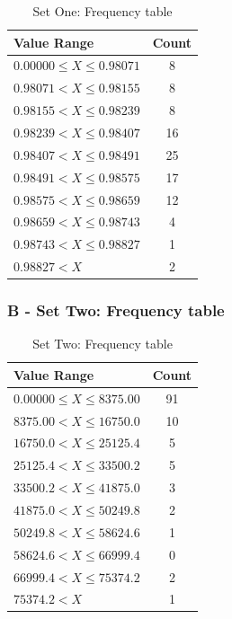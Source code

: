 \documentclass[10pt]{report}
\begin{document}
\begin{table}[h!]
	\centering

	\begin{tabular}{ | l | c | }
		\hline
		Value Range & Count \\
		\hline
		$0.00000 \leq X \leq   0.98071$ & 8  \\
		$0.98071 < X \leq   0.98155$ & 8  \\
		$0.98155 < X \leq   0.98239$ & 8  \\
		$0.98239 < X \leq   0.98407$ & 16 \\
		$0.98407 < X \leq   0.98491$ & 25 \\
		$0.98491 < X \leq   0.98575$ & 17 \\
		$0.98575 < X \leq   0.98659$ & 12 \\
		$0.98659 < X \leq   0.98743$ & 4  \\
		$0.98743 < X \leq   0.98827$ & 1  \\
		$0.98827 < X               $ & 2  \\
		\hline
	\end{tabular}
	\caption{Set One: Frequency table}
\end{table}



\subsubsection*{B - Set Two: Frequency table}

\begin{table}[h!]
	\centering

	\begin{tabular}{ | l | c | }
		\hline
		Value Range & Count \\
		\hline
		$0.00000 \leq X \leq 8375.00$ & 91 \\
		$8375.00  < X \leq 16750.0$ & 10 \\
		$16750.0  < X \leq 25125.4$ & 5  \\
		$25125.4  < X \leq 33500.2$ & 5  \\
		$33500.2  < X \leq 41875.0$ & 3  \\
		$41875.0  < X \leq 50249.8$ & 2  \\
		$50249.8  < X \leq 58624.6$ & 1  \\
		$58624.6  < X \leq 66999.4$ & 0  \\
		$66999.4  < X \leq 75374.2$ & 2  \\
		$75374.2  < X             $ & 1  \\
		\hline
	\end{tabular}
	\caption{Set Two: Frequency table}
\end{table}
\end{document}
